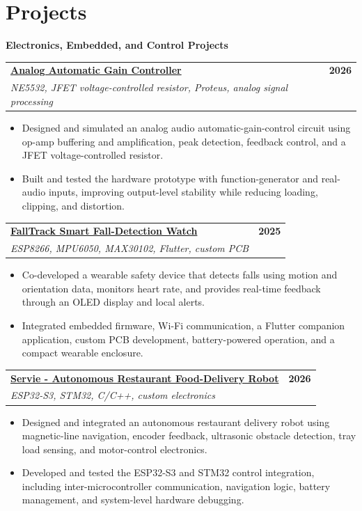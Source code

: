 \documentclass[a4paper,10pt]{article}
\makeatletter
\newcommand{\projectEntry}[3]{%
  \Needspace{9\baselineskip}%
  \begin{tabularx}{\textwidth}{@{}Xr@{}}
    \textbf{#1} & \textbf{\small #3} \\
    {\small\textit{#2}} &
  \end{tabularx}
  \vspace{0.35mm}
}
\newcommand{\projectCategory}[1]{%
  \vspace{1.0mm}
  {\normalsize\bfseries\color{accent} #1}\par
  \vspace{0.75mm}
}
\makeatother
\begin{document}
\section{Projects}

\projectCategory{Electronics, Embedded, and Control Projects}

\projectEntry
  {\href{https://github.com/hakammra/automatic-gain-controller}{Analog Automatic Gain Controller \faGithub}}
  {NE5532, JFET voltage-controlled resistor, Proteus, analog signal processing}
  {2026}
\begin{itemize}
  \item Designed and simulated an analog audio automatic-gain-control circuit using op-amp buffering and amplification, peak detection, feedback control, and a JFET voltage-controlled resistor.
  \item Built and tested the hardware prototype with function-generator and real-audio inputs, improving output-level stability while reducing loading, clipping, and distortion.
\end{itemize}
\vspace{1.35mm}

\projectEntry
  {\href{https://github.com/hakammra/falltrack-watch}{FallTrack Smart Fall-Detection Watch \faGithub}}
  {ESP8266, MPU6050, MAX30102, Flutter, custom PCB}
  {2025}
\begin{itemize}
  \item Co-developed a wearable safety device that detects falls using motion and orientation data, monitors heart rate, and provides real-time feedback through an OLED display and local alerts.
  \item Integrated embedded firmware, Wi-Fi communication, a Flutter companion application, custom PCB development, battery-powered operation, and a compact wearable enclosure.
\end{itemize}
\vspace{1.35mm}

\projectEntry
  {\href{https://github.com/hakammra/Restaurent-Robot}{Servie - Autonomous Restaurant Food-Delivery Robot \faGithub}}
  {ESP32-S3, STM32, C/C++, custom electronics}
  {2026}
\begin{itemize}
  \item Designed and integrated an autonomous restaurant delivery robot using magnetic-line navigation, encoder feedback, ultrasonic obstacle detection, tray load sensing, and motor-control electronics.
  \item Developed and tested the ESP32-S3 and STM32 control integration, including inter-microcontroller communication, navigation logic, battery management, and system-level hardware debugging.
\end{itemize}
\vspace{1.35mm}
\end{document}
